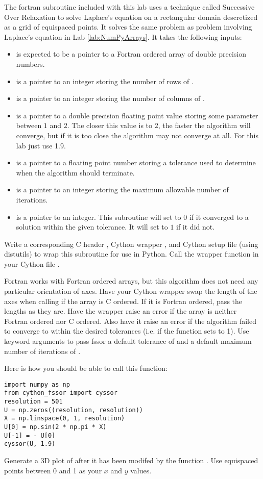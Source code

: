 \begin{problem}
The fortran subroutine  included with this lab uses a technique called Successive Over Relaxation to solve Laplace's equation on a rectangular domain descretized as a grid of equispaced points.
It solves the same problem as problem involving Laplace's equation in Lab \ref{lab:NumPyArrays}.
It takes the following inputs:
\begin{itemize}
\item {} is expected to be a pointer to a Fortran ordered array of double precision numbers.
\item {} is a pointer to an integer storing the number of rows of .
\item {} is a pointer to an integer storing the number of columns of .
\item {} is a pointer to a double precision floating point value storing some parameter between $1$ and $2$.
The closer this value is to $2$, the faster the algorithm will converge, but if it is too close the algorithm may not converge at all.
For this lab just use 1.9.
\item {} is a pointer to a floating point number storing a tolerance used to determine when the algorithm should terminate.
\item {} is a pointer to an integer storing the maximum allowable number of iterations.
\item {} is a pointer to an integer.
This subroutine will set  to $0$ if it converged to a solution within the given tolerance.
It will set  to $1$ if it did not.
\end{itemize}

Write a corresponding C header , Cython wrapper , and Cython setup file (using distutils)  to wrap this subroutine for use in Python.
Call the wrapper function in your Cython file .

Fortran works with Fortran ordered arrays, but this algorithm does not need any particular orientation of axes.
Have your Cython wrapper swap the length of the axes when calling  if the array is C ordered.
If it is Fortran ordered, pass the lengths as they are.
Have the wrapper raise an error if the array  is neither Fortran ordered nor C ordered.
Also have it raise an error if the algorithm failed to converge to within the desired tolerances (i.e. if the function sets  to 1).
Use keyword arguments to pass fssor a default tolerance of  and a default maximum number of iterations of .

Here is how you should be able to call this function:
\begin{lstlisting}
import numpy as np
from cython_fssor import cyssor
resolution = 501
U = np.zeros((resolution, resolution))
X = np.linspace(0, 1, resolution)
U[0] = np.sin(2 * np.pi * X)
U[-1] = - U[0]
cyssor(U, 1.9)
\end{lstlisting}

Generate a 3D plot of  after it has been modifed by the function .
Use equispaced points between 0 and 1 as your $x$ and $y$ values.
\end{problem}

